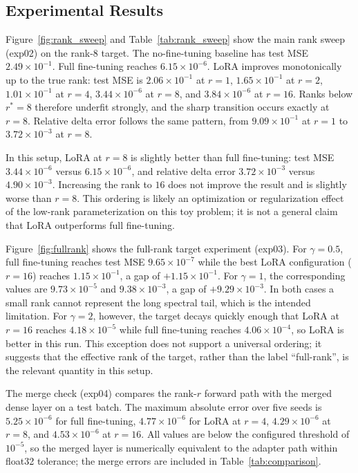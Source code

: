 \subsection{Experimental Results}

Figure~\ref{fig:rank_sweep} and Table~\ref{tab:rank_sweep} show the main rank sweep (exp02) on the rank-8 target. The no-fine-tuning baseline has test MSE $2.49\times10^{-1}$. Full fine-tuning reaches $6.15\times10^{-6}$. LoRA improves monotonically up to the true rank: test MSE is $2.06\times10^{-1}$ at $r=1$, $1.65\times10^{-1}$ at $r=2$, $1.01\times10^{-1}$ at $r=4$, $3.44\times10^{-6}$ at $r=8$, and $3.84\times10^{-6}$ at $r=16$. Ranks below $r^{*}=8$ therefore underfit strongly, and the sharp transition occurs exactly at $r=8$. Relative delta error follows the same pattern, from $9.09\times10^{-1}$ at $r=1$ to $3.72\times10^{-3}$ at $r=8$.



In this setup, LoRA at $r=8$ is slightly better than full fine-tuning: test MSE $3.44\times10^{-6}$ versus $6.15\times10^{-6}$, and relative delta error $3.72\times10^{-3}$ versus $4.90\times10^{-3}$. Increasing the rank to $16$ does not improve the result and is slightly worse than $r=8$. This ordering is likely an optimization or regularization effect of the low-rank parameterization on this toy problem; it is not a general claim that LoRA outperforms full fine-tuning.

Figure~\ref{fig:fullrank} shows the full-rank target experiment (exp03). For $\gamma=0.5$, full fine-tuning reaches test MSE $9.65\times10^{-7}$ while the best LoRA configuration ($r=16$) reaches $1.15\times10^{-1}$, a gap of $+1.15\times10^{-1}$. For $\gamma=1$, the corresponding values are $9.73\times10^{-5}$ and $9.38\times10^{-3}$, a gap of $+9.29\times10^{-3}$. In both cases a small rank cannot represent the long spectral tail, which is the intended limitation. For $\gamma=2$, however, the target decays quickly enough that LoRA at $r=16$ reaches $4.18\times10^{-5}$ while full fine-tuning reaches $4.06\times10^{-4}$, so LoRA is better in this run. This exception does not support a universal ordering; it suggests that the effective rank of the target, rather than the label ``full-rank'', is the relevant quantity in this setup.

The merge check (exp04) compares the rank-$r$ forward path with the merged dense layer on a test batch. The maximum absolute error over five seeds is $5.25\times10^{-6}$ for full fine-tuning, $4.77\times10^{-6}$ for LoRA at $r=4$, $4.29\times10^{-6}$ at $r=8$, and $4.53\times10^{-6}$ at $r=16$. All values are below the configured threshold of $10^{-5}$, so the merged layer is numerically equivalent to the adapter path within float32 tolerance; the merge errors are included in Table~\ref{tab:comparison}.

